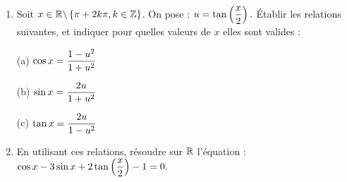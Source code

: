 \documentclass[a4paper, 11pt]{article}
\begin{document}
\begin{exercice}  \;
\begin{enumerate}
\item Soit $\displaystyle x \in \mathbb{R}\backslash \left\{ \pi + 2 k \pi, k \in \mathbb{Z} \right\}$. On pose : $u =  \tan \left(\displaystyle \frac{x}{2} \right).$ \'Etablir les relations suivantes, et indiquer pour quelles valeurs de $x$ elles sont valides :\\
\begin{minipage}[t]{0.3\textwidth}
(a) $\displaystyle \cos x = \frac{1-u^2}{1+u^2}$
\end{minipage}
\begin{minipage}[t]{0.3\textwidth}
(b)  $\displaystyle \sin x = \frac{2 u}{1+u^2}$
\end{minipage}
\begin{minipage}[t]{0.3\textwidth}
(c) $\displaystyle \tan x = \frac{2 u}{1-u^2}$
\end{minipage}
\item En utilisant ces relations, r\'esoudre sur $\mathbb{R}$ l'\'equation : $\displaystyle \cos x - 3 \sin x + 2\tan \left( \frac{x}{2} \right) - 1 = 0.$
\end{enumerate}
\end{exercice}
\end{document}
